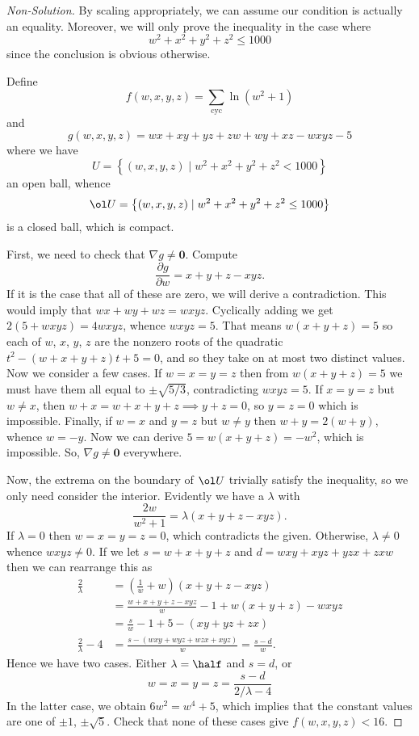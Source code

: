 \documentclass[11pt]{scrartcl}
\begin{document}
\begin{proof}[Non-Solution]
  By scaling appropriately, we can assume our condition is actually an equality.
  Moreover, we will only prove the inequality in the case where
  \[ w^2+x^2+y^2+z^2 \le 1000 \]
  since the conclusion is obvious otherwise.

  Define
  \[ f(w,x,y,z) = \sum_{\text{cyc}} \ln (w^2+1) \]
  and
  \[ g(w,x,y,z) = wx+xy+yz+zw+wy+xz-wxyz-5 \]
  where we have
  \[ U = \left\{ (w,x,y,z) \mid w^2+x^2+y^2+z^2 < 1000 \right\} \]
  an open ball, whence
  \[ \ol U = \left\{ (w,x,y,z) \mid w^2+x^2+y^2+z^2 \le 1000 \right\} \]
  is a closed ball, which is compact.

  First, we need to check that $\nabla g \neq \mathbf 0$. Compute
  \[ \frac{\partial g}{\partial w} = x+y+z - xyz. \]
  If it is the case that all of these are zero, we will derive a contradiction.
  This would imply that $wx+wy+wz = wxyz$.
  Cyclically adding we get $2(5+wxyz) = 4wxyz$, whence $wxyz = 5$.
  That means $w(x+y+z) = 5$
  so each of $w$, $x$, $y$, $z$ are the nonzero roots of the quadratic $t^2-(w+x+y+z)t+5 = 0$,
  and so they take on at most two distinct values.
  Now we consider a few cases. If $w=x=y=z$ then from $w(x+y+z) = 5$
  we must have them all equal to $\pm \sqrt{5/3}$, contradicting $wxyz=5$.
  If $x=y=z$ but $w \neq x$, then $w+x=w+x+y+z \implies y+z = 0$, so $y=z=0$ which is impossible.
  Finally, if $w=x$ and $y=z$ but $w \neq y$ then $w+y=2(w+y)$, whence $w=-y$.
  Now we can derive $5=w(x+y+z)=-w^2$, which is impossible.
  So, $\nabla g \neq \mathbf 0$ everywhere.

  Now, the extrema on the boundary of $\ol U$ trivially satisfy the inequality,
  so we only need consider the interior.
  Evidently we have a $\lambda$ with
  \[ \frac{2w}{w^2+1} = \lambda (x+y+z-xyz). \]
  If $\lambda = 0$ then $w=x=y=z=0$, which contradicts the given.
  Otherwise, $\lambda \neq 0$ whence $wxyz \neq 0$.
  If we let $s = w+x+y+z$ and $d = wxy+xyz+yzx+zxw$ then we can rearrange this as
  \begin{align*}
    \frac{2}{\lambda} &= \left( \frac 1w+w \right)(x+y+z-xyz) \\
    &= \frac{w+x+y+z-xyz}{w}-1 + w(x+y+z) - wxyz \\
    &= \frac{s}{w} - 1 + 5-(xy+yz+zx) \\
    \frac{2}{\lambda}-4 &= \frac{s - (wxy+wyz+wzx+xyz)}{w} = \frac{s-d}{w}.
  \end{align*}
  Hence we have two cases. Either $\lambda = \half$ and $s = d$, or
  \[ w = x = y = z = \frac{s-d}{2/\lambda - 4} \]
  In the latter case, we obtain $6w^2 = w^4+5$,
  which implies that the constant values are one of $\pm 1$, $\pm \sqrt{5}$.
  Check that none of these cases give $f(w,x,y,z) < 16$.


\end{proof}
\end{document}

